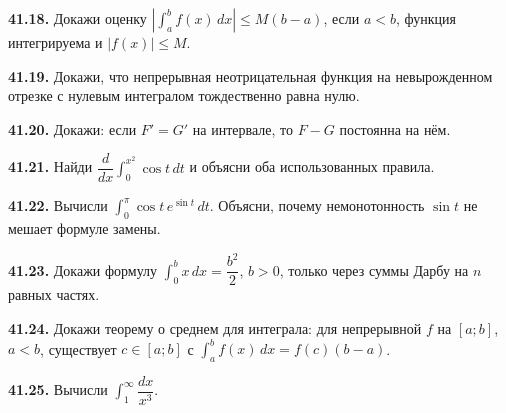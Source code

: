\noindent\begin{minipage}[t]{\linewidth}\textbf{41.18.} Докажи оценку \(\left|\int_a^b f(x)\,dx\right|\le M(b-a)\), если \(a<b\), функция интегрируема и \(|f(x)|\le M\).\par\end{minipage}\par
\noindent\begin{minipage}[t]{\linewidth}\textbf{41.19.}\starmark{} Докажи, что непрерывная неотрицательная функция на невырожденном отрезке с нулевым интегралом тождественно равна нулю.\par\end{minipage}\par
\noindent\begin{minipage}[t]{\linewidth}\textbf{41.20.} Докажи: если \(F'=G'\) на интервале, то \(F-G\) постоянна на нём.\par\end{minipage}\par
\noindent\begin{minipage}[t]{\linewidth}\textbf{41.21.}\starmark{} Найди \(\dfrac{d}{dx}\int_0^{x^2}\cos t\,dt\) и объясни оба использованных правила.\par\end{minipage}\par
\noindent\begin{minipage}[t]{\linewidth}\textbf{41.22.}\starmark{} Вычисли \(\int_0^\pi \cos t\,e^{\sin t}\,dt\). Объясни, почему немонотонность \(\sin t\) не мешает формуле замены.\par\end{minipage}\par
\noindent\begin{minipage}[t]{\linewidth}\textbf{41.23.}\starmark{} Докажи формулу \(\int_0^b x\,dx=\dfrac{b^2}2\), \(b>0\), только через суммы Дарбу на \(n\) равных частях.\par\end{minipage}\par
\noindent\begin{minipage}[t]{\linewidth}\textbf{41.24.}\starmark{} Докажи теорему о среднем для интеграла: для непрерывной \(f\) на \([a;b]\), \(a<b\), существует \(c\in[a;b]\) с \(\int_a^b f(x)\,dx=f(c)(b-a)\).\par\end{minipage}\par
\noindent\begin{minipage}[t]{\linewidth}\textbf{41.25.} Вычисли \(\int_1^\infty\dfrac{dx}{x^3}\).\par\end{minipage}\par
